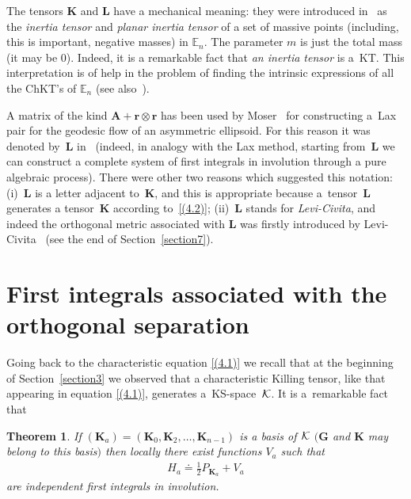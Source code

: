 \documentclass[pdftex]{sigma}
\def\bs{\boldsymbol}
\numberwithin{equation}{section}
\newtheorem{Theorem}{Theorem}[section]
 { \theoremstyle{definition}
\newtheorem{Notation}[Theorem]{Notation}
\newtheorem{Example}[Theorem]{Example}
\newtheorem{Remark}[Theorem]{Remark}
\newtheorem{Remarks}[Theorem]{Remarks}
 }
\begin{document}
The tensors $\bs K$ and $\bs L$ have a mechanical meaning: they were introduced in~\cite{Benenti-1992b} as the {\it inertia tensor} and {\it planar inertia tensor} of a set of massive points (including, this is important, negative masses) in $\mathbb E_n$. The parameter $m$ is just the total mass (it may be $0$). Indeed, it is a remarkable fact that {\it an inertia tensor} is a~KT. This interpretation is of help in the problem of f\/inding the intrinsic expressions of all the ChKT's of $\mathbb E_n$ (see also~\cite{Marshall-Wojciechowski-1988}).

\begin{Notation}  A matrix of the kind $\bs A+\bs r\otimes\bs r$ has been used by Moser~\cite{Moser-1981} for constructing a~Lax pair for the geodesic f\/low of an asymmetric ellipsoid. For this reason it was denoted by~$\bs L$ in~\cite{Benenti-1992b} (indeed, in analogy with the Lax method, starting from~$\bs L$ we can construct  a complete system of f\/irst integrals in involution through a pure algebraic process). There were other two reasons which suggested this notation: (i)~$\bs L$ is a letter adjacent to~$\bs K$, and this is appropriate because a~tensor~$\bs L$ generates a tensor~$\bs K$ according to~\eqref{(4.2)}; (ii)~$\bs L$ stands for {\it Levi-Civita}, and indeed the orthogonal metric associated with $\bs L$ was f\/irstly introduced by Levi-Civita~\cite{LC-1896} (see the end of Section~\ref{section7}).
\end{Notation}

\section{First integrals associated with the orthogonal separation}\label{section5}

Going back to the characteristic equation \eqref{(4.1)} we recall that at the beginning of Section~\ref{section3} we observed that a characteristic Killing tensor, like that appearing in equation \eqref{(4.1)}, generates a~KS-space~$\cal K$. It is a~remarkable fact that

\begin{Theorem}\label{t:5.1}
If $(\bs K_a)=(\bs K_0, \bs K_2, \ldots, \bs K_{n-1})$ is a basis of $\cal K$  $(\bs G$ and $\bs K$ may belong to this basis$)$ then locally there exist functions $V_a$ such that
\begin{gather}
H_a\doteq \tfrac 12 P_{\bs K_a}+V_a
\label{(5.1)}
\end{gather}
are independent first integrals in involution.
\end{Theorem}
\end{document}
